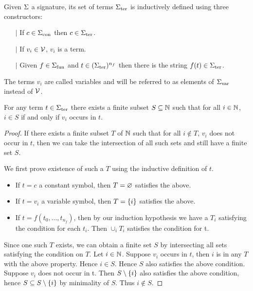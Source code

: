 \begin{dfn}[$\Si$-terms]
    Given $\Si$ a signature, its set of terms
    ${\Sigma}_\mathrm{ter}$ is inductively defined using three constructors:
    \begin{itemize}
        \item[$\vert$] If $c \in {\Sigma}_\mathrm{con}$
            then $c \in {\Sigma}_\mathrm{ter}$.
        \item[$\vert$] If $v_i \in \mathcal{V}$, 
            $v_i$ is a term.
        \item[$\vert$] Given $f \in {\Sigma}_\mathrm{fun}$ and 
            $t  \in ({\Sigma}_\mathrm{ter})^{n_f}$
            then there is the string $f(t) \in {\Sigma}_\mathrm{ter}$.
    \end{itemize}
\end{dfn}
The terms $v_i$ are called variables and will be 
referred to as elements of ${\Sigma}_\mathrm{var}$ instead of $\mathcal{V}$.

\begin{prop}
    For any term $t \in {\Sigma}_\mathrm{ter}$ there exists a finite subset 
    $S \subseteq \mathbb{N}$ such that for all $i \in \mathbb{N}$, $i \in S$ if and only if 
    $v_i$ occurs in $t$.
\end{prop}
\begin{proof}
    If there exists a finite subset $T$ of $\mathbb{N}$ such that for all 
    $i \notin T$, 
    $v_i$ does not occur in $t$, 
    then we can take the intersection of all such
    sets and still have a finite set $S$.
    
    We first prove existence of such a 
    $T$ using the inductive definition of $t$.
    \begin{itemize}
        \item If $t = c$ a constant symbol, 
        then $T = \varnothing$ satisfies the above.
        \item If $t = v_i$ a variable symbol, 
        then $T = \left\{i\right\}$ satisfies the above.
        \item If $t = f(t_0, \dots, t_{n_f})$, 
        then by our induction hypothesis we have 
        a $T_i$ satisfying the condition for each $t_i$. 
        Then $\cup_{i} T_i$ satisfies the condition for t.
    \end{itemize}
    
    Since one such $T$ exists, 
    we can obtain a finite set $S$ by intersecting all 
    sets satisfying the condition on $T$. 
    Let $i \in \mathbb{N}$.
    Suppose $v_i$ occurs in $t$, 
    then $i$ is in any $T$ with the above property. 
    Hence $i \in S$. 
    Hence $S$ also satisfies the above condition.
    Suppose $v_i$ does not occur in t. 
    Then $S \setminus \left\{i\right\}$ also satisfies the above condition,
    hence $S \subseteq S \setminus \left\{i\right\}$ by minimality of $S$.
    Thus $i\notin S$.
\end{proof}

